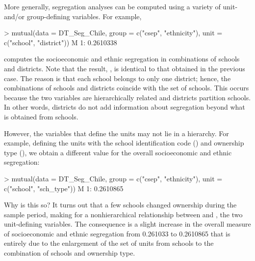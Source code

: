 More generally, segregation analyses can be computed using a variety of unit- and/or group-defining variables. For example,
\begin{example}
> mutual(data = DT_Seg_Chile,
         group = c("csep", "ethnicity"),
         unit = c("school", "district"))
           M
1: 0.2610338
\end{example}
computes the socioeconomic and ethnic segregation in combinations of schools and districts. Note that the result, , is identical to that obtained in the previous case. The reason is that each school belongs to only one district; hence, the combinations of schools and districts coincide with the set of schools. This occurs because the two variables are hierarchically related and districts partition schools. In other words, districts do not add information about segregation beyond what is obtained from schools.

However, the variables that define the units may not lie in a hierarchy. For example, defining the units with the school identification code () and ownership type (), we obtain a different value for the overall socioeconomic and ethnic segregation:
\begin{example}
> mutual(data = DT_Seg_Chile,
         group = c("csep", "ethnicity"),
         unit = c("school", "sch_type"))
           M
1: 0.2610865
\end{example}
Why is this so? It turns out that a few schools changed ownership during the sample period, making for a nonhierarchical relationship between  and , the two unit-defining variables. The consequence is a slight increase in the overall measure of socioeconomic and ethnic segregation from 0.261033 to 0.2610865 that is entirely due to the enlargement of the set of units from schools to the combination of schools and ownership type.

